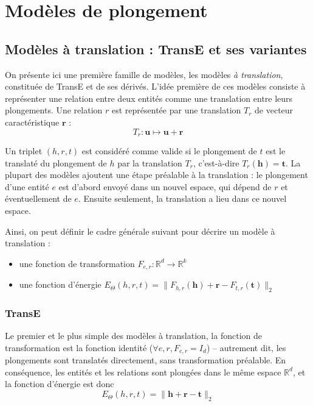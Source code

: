 \section{Modèles de plongement}
\label{sec:kge-models}

\subsection{Modèles à translation : TransE et ses variantes}
\label{subsec:kge-models-transx}

On présente ici une première famille de modèles, les modèles \textit{à translation}, constituée de TransE et de ses dérivés. L'idée première de ces modèles consiste à représenter une relation entre deux entités comme une translation entre leurs plongements. Une relation $r$ est représentée par une translation $T_r$ de vecteur caractéristique $\mathbf{r}$ :
\begin{equation*}
    T_r : \mathbf{u} \mapsto \mathbf{u + r}
\end{equation*}

Un triplet $(h, r, t)$ est considéré comme valide si le plongement de $t$ est le translaté du plongement de $h$ par la translation $T_r$, c'est-à-dire $T_r(\mathbf{h}) = \mathbf{t}$. La plupart des modèles ajoutent une étape préalable à la translation : le plongement d'une entité $e$ est d'abord envoyé dans un nouvel espace, qui dépend de $r$ et éventuellement de $e$. Ensuite seulement, la translation a lieu dans ce nouvel espace.

Ainsi, on peut définir le cadre générale suivant pour décrire un modèle à translation :
\begin{itemize}
    \item une fonction de transformation $F_{e, r} : \mathbb{R}^d \rightarrow \mathbb{R}^{k}$
    \item une fonction d'énergie $E_\Theta(h, r, t) = \| F_{h, r}(\mathbf{h}) + \mathbf{r} - F_{t, r}(\mathbf{t}) \|_2 $
\end{itemize}

\subsubsection{TransE \cite{bordes2013translating}}
Le premier et le plus simple des modèles à translation, la fonction de transformation est la fonction identité ($\forall e, r, F_{e, r} = I_d$) – autrement dit, les plongements sont translatés directement, sans transformation préalable. En conséquence, les entités et les relations sont plongées dans le même espace $\mathbb{R}^d$, et la fonction d'énergie est donc
\begin{equation}
    E_\Theta(h, r, t) = \| \mathbf{h + r - t} \|_2
    \label{eq:transe-main}
\end{equation}

